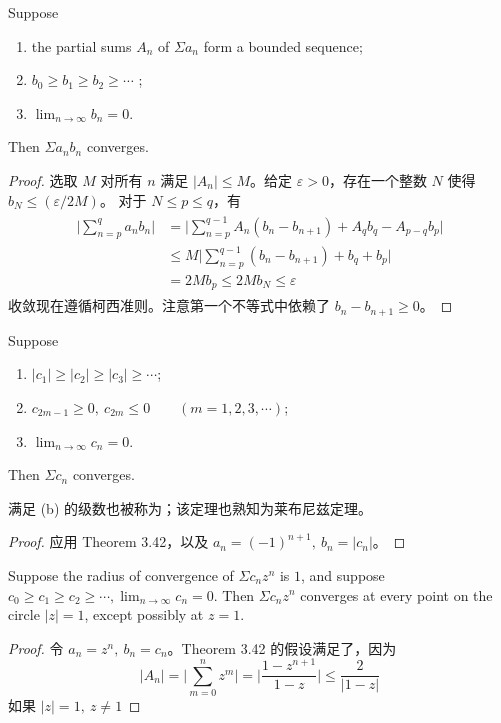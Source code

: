 \documentclass[../poma-notes.tex]{subfiles}
\begin{document}
\begin{theorem}
  Suppose
  \begin{enumerate}[label=(\alph*)]
    \item the partial sums $A_n$ of $\Sigma a_n$ form a bounded sequence;
    \item $b_0 \ge b_1 \ge b_2 \ge \cdots$ ;
    \item $\lim_{n\to\infty} b_n = 0$.
  \end{enumerate}
  Then $\Sigma a_n b_n$ converges.
\end{theorem}

\begin{proof}
  选取 $M$ 对所有 $n$ 满足 $|A_n| \le M$。给定 $\varepsilon > 0$，存在一个整数 $N$ 使得 $b_N \le (\varepsilon/2M)$。
  对于 $N \le p \le q$，有
  \begin{align*}
    \begin{split}
      \Biggl|\sum_{n=p}^{q} a_n b_n\Biggr| & = \Biggl|\sum_{n=p}^{q-1} A_n(b_n - b_{n+1}) + A_q b_q - A_{p-q} b_p\Biggr| \\
      & \le M \Biggl|\sum_{n=p}^{q-1}(b_n-b_{n+1}) + b_q + b_p\Biggr| \\
      & = 2M b_p \le 2M b_N \le \varepsilon
    \end{split}
  \end{align*}
  收敛现在遵循柯西准则。注意第一个不等式中依赖了 $b_n - b_{n+1} \ge 0$。
\end{proof}

\begin{theorem}
  Suppose
  \begin{enumerate}[label=(\alph*)]
    \item $|c_1| \ge |c_2| \ge |c_3| \ge \cdots$;
    \item $c_{2m-1} \ge 0,\ c_{2m} \le 0 \qquad (m=1,2,3,\cdots)$;
    \item $\lim_{n\to\infty} c_n = 0$.
  \end{enumerate}
  Then $\Sigma c_n$ converges.

  满足 (b) 的级数也被称为；该定理也熟知为莱布尼兹定理。
\end{theorem}

\begin{proof}
  应用 Theorem 3.42，以及 $a_n = (-1)^{n+1},\ b_n = |c_n|$。
\end{proof}

\begin{theorem} Suppose the radius of convergence of $\Sigma c_n z^n$ is $1$, and suppose $c_0\ge c_1\ge c_2\ge\cdots,
    \lim_{n\to\infty}c_n = 0$. Then $\Sigma c_n z^n$ converges at every point on the circle $|z|=1$,
  except possibly at $z=1$.
\end{theorem}

\begin{proof}
  令 $a_n = z^n,\ b_n = c_n$。Theorem 3.42 的假设满足了，因为
  \[
    |A_n| = \Biggl|\sum_{m=0}^{n}z^m\Biggr| = \Biggl|\frac{1-z^{n+1}}{1-z}\Biggr| \le \frac{2}{|1-z|}
  \]
  如果 $|z| = 1,\ z \ne 1$
\end{proof}
\end{document}
